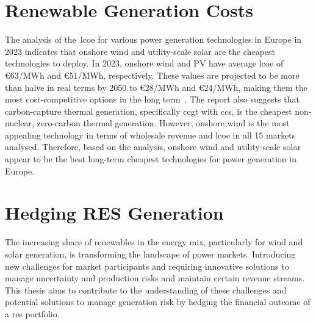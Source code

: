 \section{Renewable Generation Costs}
\label{sec:wind_solar_lcoe}

  The analysis of the~\gls{lcoe} for various power generation technologies in Europe in 2023
  indicates that onshore wind and utility-scale solar are the cheapest technologies to deploy.
  In 2023, onshore wind and PV have average \gls{lcoe} of €63/MWh and €51/MWh, respectively.
  These values are projected to be more than halve in real terms by 2050 to €28/MWh and €24/MWh,
  making them the most cost-competitive options in the long term~\cite{abdullah_europe_2023}.
  The report also suggests that carbon-capture thermal generation,
  specifically \gls{ccgt} with \gls{ccs}, is the cheapest non-nuclear, zero-carbon thermal generation.
  However, onshore wind is the most appealing technology in terms of wholesale revenue and \gls{lcoe}
  in all 15 markets analysed.
  Therefore, based on the analysis, onshore wind and utility-scale solar appear to be the best
  long-term cheapest technologies for power generation in Europe.\\

\section{Hedging RES Generation}
\label{sec:hedging_res}

    The increasing share of renewables in the energy mix, particularly for wind and solar generation,
    is transforming the landscape of power markets.
    Introducing new challenges for market participants and requiring innovative solutions to manage uncertainty and
    production risks and maintain certain revenue streams.
    This thesis aims to contribute to the understanding of these challenges and potential solutions
    to manage generation risk by hedging the financial outcome of a \gls{res} portfolio.\\


